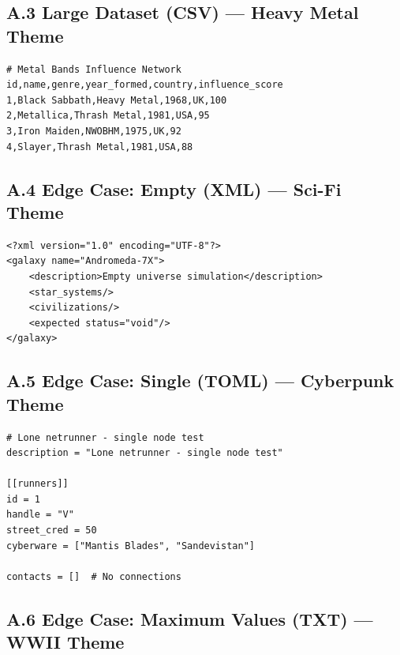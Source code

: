 \subsection*{A.3 Large Dataset (CSV) --- Heavy Metal Theme}

\begin{lstlisting}[style=plaintext, caption={data/input\_large.csv}]
# Metal Bands Influence Network
id,name,genre,year_formed,country,influence_score
1,Black Sabbath,Heavy Metal,1968,UK,100
2,Metallica,Thrash Metal,1981,USA,95
3,Iron Maiden,NWOBHM,1975,UK,92
4,Slayer,Thrash Metal,1981,USA,88
\end{lstlisting}

\subsection*{A.4 Edge Case: Empty (XML) --- Sci-Fi Theme}

\begin{lstlisting}[style=xml, caption={data/edge\_case\_empty.xml}]
<?xml version="1.0" encoding="UTF-8"?>
<galaxy name="Andromeda-7X">
    <description>Empty universe simulation</description>
    <star_systems/>
    <civilizations/>
    <expected status="void"/>
</galaxy>
\end{lstlisting}

\subsection*{A.5 Edge Case: Single (TOML) --- Cyberpunk Theme}

\begin{lstlisting}[style=toml, caption={data/edge\_case\_single.toml}]
# Lone netrunner - single node test
description = "Lone netrunner - single node test"

[[runners]]
id = 1
handle = "V"
street_cred = 50
cyberware = ["Mantis Blades", "Sandevistan"]

contacts = []  # No connections
\end{lstlisting}

\subsection*{A.6 Edge Case: Maximum Values (TXT) --- WWII Theme}

